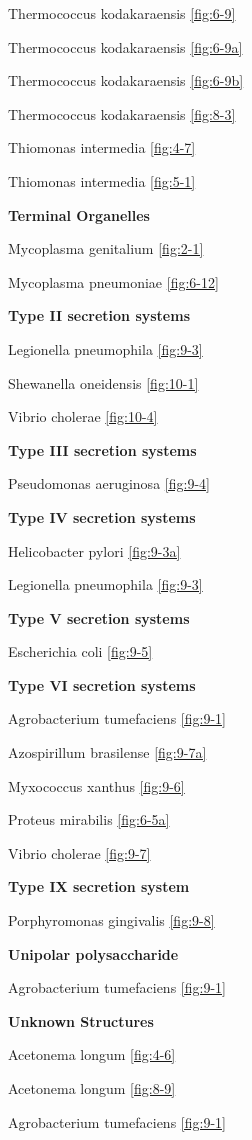 \documentclass[]{tufte-book}
\begin{document}
Thermococcus kodakaraensis \ref{fig:6-9}

Thermococcus kodakaraensis \ref{fig:6-9a}

Thermococcus kodakaraensis \ref{fig:6-9b}

Thermococcus kodakaraensis \ref{fig:8-3}

Thiomonas intermedia \ref{fig:4-7}

Thiomonas intermedia \ref{fig:5-1}

\textbf{Terminal Organelles}

Mycoplasma genitalium \ref{fig:2-1}

Mycoplasma pneumoniae \ref{fig:6-12}

\textbf{Type II secretion systems}

Legionella pneumophila \ref{fig:9-3}

Shewanella oneidensis \ref{fig:10-1}

Vibrio cholerae \ref{fig:10-4}

\textbf{Type III secretion systems}

Pseudomonas aeruginosa \ref{fig:9-4}

\textbf{Type IV secretion systems}

Helicobacter pylori \ref{fig:9-3a}

Legionella pneumophila \ref{fig:9-3}

\textbf{Type V secretion systems}

Escherichia coli \ref{fig:9-5}

\textbf{Type VI secretion systems}

Agrobacterium tumefaciens \ref{fig:9-1}

Azospirillum brasilense \ref{fig:9-7a}

Myxococcus xanthus \ref{fig:9-6}

Proteus mirabilis \ref{fig:6-5a}

Vibrio cholerae \ref{fig:9-7}

\textbf{Type IX secretion system}

Porphyromonas gingivalis \ref{fig:9-8}

\textbf{Unipolar polysaccharide}

Agrobacterium tumefaciens \ref{fig:9-1}

\textbf{Unknown Structures}

Acetonema longum \ref{fig:4-6}

Acetonema longum \ref{fig:8-9}

Agrobacterium tumefaciens \ref{fig:9-1}
\end{document}
